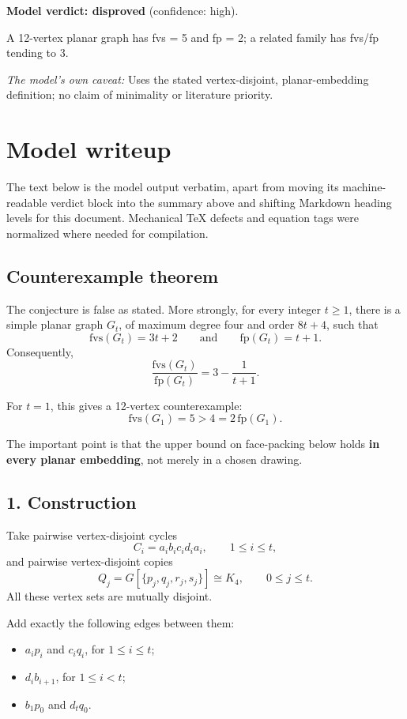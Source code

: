 \documentclass[
  11pt,
  a4paper,
]{article}
\providecommand{\tightlist}{%
  \setlength{\itemsep}{0pt}\setlength{\parskip}{0pt}}
\begin{document}
\textbf{Model verdict: disproved} (confidence: high).

A 12-vertex planar graph has fvs = 5 and fp = 2; a related family has
fvs/fp tending to 3.

\emph{The model's own caveat:} Uses the stated vertex-disjoint,
planar-embedding definition; no claim of minimality or literature
priority.

\section{Model writeup}\label{model-writeup}

The text below is the model output verbatim, apart from moving its
machine-readable verdict block into the summary above and shifting
Markdown heading levels for this document. Mechanical TeX defects and
equation tags were normalized where needed for compilation.

\subsection{Counterexample theorem}\label{counterexample-theorem}

The conjecture is false as stated. More strongly, for every integer
\(t\ge 1\), there is a simple planar graph \(G_t\), of maximum degree
four and order \(8t+4\), such that \[
\mathrm{fvs}(G_t)=3t+2
\qquad\text{and}\qquad
\mathrm{fp}(G_t)=t+1.
\] Consequently, \[
\frac{\mathrm{fvs}(G_t)}{\mathrm{fp}(G_t)}
=3-\frac1{t+1}.
\]

For \(t=1\), this gives a 12-vertex counterexample: \[
\mathrm{fvs}(G_1)=5>4=2\,\mathrm{fp}(G_1).
\]

The important point is that the upper bound on face-packing below holds
\textbf{in every planar embedding}, not merely in a chosen drawing.

\subsection{1. Construction}\label{construction}

Take pairwise vertex-disjoint cycles \[
C_i=a_i b_i c_i d_i a_i,\qquad 1\le i\le t,
\] and pairwise vertex-disjoint copies \[
Q_j=G[\{p_j,q_j,r_j,s_j\}]\cong K_4,\qquad 0\le j\le t.
\] All these vertex sets are mutually disjoint.

Add exactly the following edges between them:

\begin{itemize}
\tightlist
\item
  \(a_i p_i\) and \(c_i q_i\), for \(1\le i\le t\);
\item
  \(d_i b_{i+1}\), for \(1\le i<t\);
\item
  \(b_1p_0\) and \(d_tq_0\).
\end{itemize}
\end{document}
